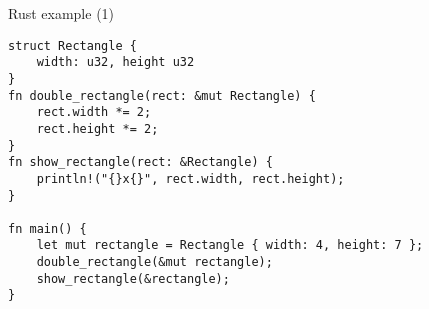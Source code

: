\usetikzlibrary{positioning,shapes.callouts}
\begin{frame}[fragile,label=rustTimesTwo]{Rust example (1)}
\begin{verbatim}
struct Rectangle {
    width: u32, height u32
}
fn double_rectangle(rect: &mut Rectangle) {
    rect.width *= 2;
    rect.height *= 2;
}
fn show_rectangle(rect: &Rectangle) {
    println!("{}x{}", rect.width, rect.height);
}

fn main() {
    let mut rectangle = Rectangle { width: 4, height: 7 };
    double_rectangle(&mut rectangle);
    show_rectangle(&rectangle);
}
\end{verbatim}
\end{frame}
